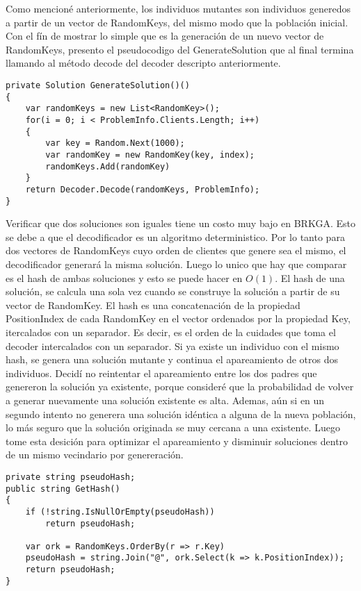 \bigskip

Como mencioné anteriormente, los individuos mutantes son individuos generedos a partir de un vector de RandomKeys, del mismo modo que la población inicial. Con el fín de mostrar lo simple que es la generación de un nuevo vector de RandomKeys, presento el pseudocodigo del GenerateSolution que al final termina llamando al método decode del decoder descripto anteriormente.

\bigskip

\begin{minipage}{\textwidth}
\begin{lstlisting}
private Solution GenerateSolution()()
{
	var randomKeys = new List<RandomKey>();
	for(i = 0; i < ProblemInfo.Clients.Length; i++)
	{
		var key = Random.Next(1000);
		var randomKey = new RandomKey(key, index);
		randomKeys.Add(randomKey)
	}
	return Decoder.Decode(randomKeys, ProblemInfo);
}
\end{lstlisting}
\end{minipage}

\bigskip

Verificar que dos soluciones son iguales tiene un costo muy bajo en BRKGA. Esto se debe a que el decodificador es un algoritmo deterministico. Por lo tanto para dos vectores de RandomKeys cuyo orden de clientes que genere sea el mismo, el decodificador generará la misma solución. Luego lo unico que hay que comparar es el hash de ambas soluciones y esto se puede hacer en $O(1)$. El hash de una solución, se calcula una sola vez cuando se construye la solución a partir de su vector de RandomKey. El hash es una concatenación de la propiedad PositionIndex de cada RandomKey en el vector ordenados por la propiedad Key, itercalados con un separador. Es decir, es el orden de la cuidades que toma el decoder intercalados con un separador. Si ya existe un individuo con el mismo hash, se genera una solución mutante y continua el apareamiento de otros dos individuos. Decidí no reintentar el apareamiento entre los dos padres que genereron la solución ya existente, porque consideré que la probabilidad de volver a generar nuevamente una solución existente es alta. Ademas, aún si en un segundo intento no generera una solución idéntica a alguna de la nueva población, lo más seguro que la solución originada se muy cercana a una existente. Luego tome esta desición para optimizar el apareamiento y disminuir soluciones dentro de un mismo vecindario por genereración.

\bigskip

\begin{minipage}{\textwidth}
\begin{lstlisting}
private string pseudoHash;
public string GetHash()
{
	if (!string.IsNullOrEmpty(pseudoHash))
		return pseudoHash;
		
	var ork = RandomKeys.OrderBy(r => r.Key)
	pseudoHash = string.Join("@", ork.Select(k => k.PositionIndex));
	return pseudoHash;
}
\end{lstlisting}
\end{minipage}

